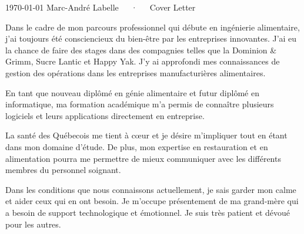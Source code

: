 \documentclass[letterpaper]{awesome-cv}
\begin{document}
\makecvheader[R]

\makecvfooter
  {\today}
  {Marc-André Labelle~~~·~~~Cover Letter}
  {}

\makelettertitle

\begin{cvletter}

    Dans le cadre de mon parcours professionnel qui débute
    en ingénierie alimentaire, j'ai toujours été
    consciencieux du bien-être par les entreprises innovantes.
    J’ai eu la chance de faire des stages dans des compagnies
    telles que la Dominion \& Grimm, Sucre Lantic et Happy Yak.
    J’y ai approfondi mes connaissances de gestion des opérations dans
    les entreprises manufacturières alimentaires.

    En tant que nouveau diplômé en génie alimentaire et futur diplômé
    en informatique, ma formation académique m’a permis de connaître
    plusieurs logiciels et leurs applications directement en entreprise.


    La santé des Québecois me tient à cœur et je désire m'impliquer tout en
    étant dans mon domaine d'étude. De plus, mon expertise en restauration
    et en alimentation pourra me permettre de mieux communiquer avec les
    différents membres du personnel soignant.

    Dans les conditions que nous connaissons actuellement,
    je sais garder mon calme et aider ceux qui en ont besoin.
    Je m'occupe présentement de ma grand-mère qui a besoin de support
    technologique et émotionnel. Je suis très patient et dévoué pour les autres.

\end{cvletter}


\makeletterclosing
\end{document}
